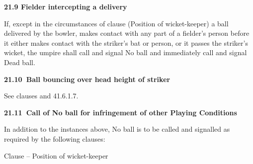 \documentclass[12pt]{article}
\begin{document}
\vspace{\baselineskip}
{\fontsize{11pt}{13.2pt}\selectfont \textbf{21.9 \tabto{0.47in} Fielder intercepting a delivery}\par}\par


\vspace{\baselineskip}
\begin{adjustwidth}{0.0in}{0.14in}
{\fontsize{9pt}{10.8pt}\selectfont If, except in the circumstances of clause (Position of wicket-keeper) a ball delivered by the bowler, makes contact with any part of a fielder’s person before it either makes contact with the striker’s bat or person, or it passes the striker’s wicket, the umpire shall call and signal No ball and immediately call and signal Dead ball.\par}\par

\end{adjustwidth}


\vspace{\baselineskip}
{\fontsize{11pt}{13.2pt}\selectfont \textbf{21.10\  Ball bouncing over head height of striker}\par}\par


\vspace{\baselineskip}
{\fontsize{9pt}{10.8pt}\selectfont See clauses and 41.6.1.7.\par}\par


\vspace{\baselineskip}
{\fontsize{11pt}{13.2pt}\selectfont \textbf{21.11\  Call of No ball for infringement of other Playing Conditions}\par}\par


\vspace{\baselineskip}
{\fontsize{9pt}{10.8pt}\selectfont In addition to the instances above, No ball is to be called and signalled as required by the following clauses:\par}\par


\vspace{\baselineskip}
\begin{adjustwidth}{0.04in}{0.0in}
{\fontsize{9pt}{10.8pt}\selectfont Clause – Position of wicket-keeper\par}\par

\end{adjustwidth}
\end{document}
